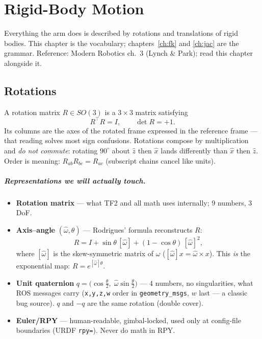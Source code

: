 \chapter{Rigid-Body Motion}
\label{ch:rigid}

Everything the arm does is described by rotations and translations of rigid bodies. This
chapter is the vocabulary; chapters~\ref{ch:fk} and \ref{ch:jac} are the grammar. Reference:
Modern Robotics ch.~3 (Lynch \& Park); read this chapter alongside it.

\section{Rotations}

A rotation matrix $R \in SO(3)$ is a $3\times3$ matrix satisfying
\[
  R^\top R = I, \qquad \det R = +1 .
\]
Its columns are the axes of the rotated frame expressed in the reference frame — that reading
solves most sign confusions. Rotations compose by multiplication and \emph{do not commute}:
rotating $90^\circ$ about $\hat z$ then $\hat x$ lands differently than $\hat x$ then $\hat z$.
Order is meaning: $R_{ab}R_{bc} = R_{ac}$ (subscript chains cancel like units).

\paragraph{Representations we will actually touch.}
\begin{itemize}
  \item \textbf{Rotation matrix} — what TF2 and all math uses internally; 9 numbers, 3 DoF.
  \item \textbf{Axis--angle} $(\hat\omega, \theta)$ — Rodrigues' formula reconstructs $R$:
  \begin{equation}
    R = I + \sin\theta\,[\hat\omega] + (1-\cos\theta)\,[\hat\omega]^2 ,
    \label{eq:rodrigues}
  \end{equation}
  where $[\hat\omega]$ is the skew-symmetric matrix of $\hat\omega$
  ($[\hat\omega]x = \hat\omega \times x$). This \emph{is} the exponential map:
  $R = e^{[\hat\omega]\theta}$.
  \item \textbf{Unit quaternion} $q = \big(\cos\tfrac\theta2,\; \hat\omega\sin\tfrac\theta2\big)$
  — 4 numbers, no singularities, what ROS messages carry (\texttt{x,y,z,w} order in
  \texttt{geometry\_msgs}, $w$ last — a classic bug source). $q$ and $-q$ are the same rotation
  (double cover).
  \item \textbf{Euler/RPY} — human-readable, gimbal-locked, used only at config-file boundaries
  (URDF \texttt{rpy=}). Never do math in RPY.
\end{itemize}

